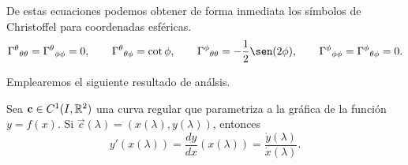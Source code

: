 \begin{remark}
De estas ecuaciones podemos obtener de forma inmediata los símbolos de Christoffel para coordenadas esféricas.
\begin{equation}
	\ChrisSym{\theta}{\theta\theta} = \ChrisSym{\theta}{\phi\phi} = 0, \qquad \ChrisSym{\theta}{\theta\phi} = \cot \phi, \qquad \ChrisSym{\phi}{\theta\theta} = -\frac12 \sen (2\phi), \qquad \ChrisSym{\phi}{\phi\phi} = \ChrisSym{\phi}{\theta\phi} = 0.
\end{equation}
\end{remark}

Emplearemos el siguiente resultado de análsis.
\begin{proposition}
	Sea $\mathbf c \in C^1(I, \mathbb R^2)$ una curva regular que parametriza a la gráfica de la función $y = f(x)$. Si $\vec c(\lambda) = (x(\lambda), y(\lambda))$, entonces
	\begin{equation}
		y'(x(\lambda)) = \frac{dy}{dx}(x(\lambda)) = \frac{\dot y (\lambda)}{\dot x(\lambda)}.
	\end{equation}
\end{proposition}

